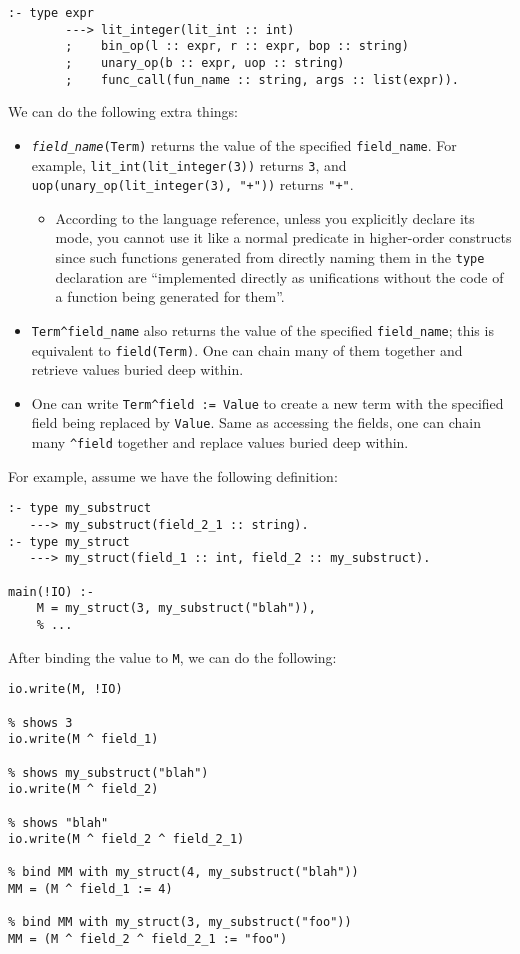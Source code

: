 \begin{lstlisting}[language=Mercury]
:- type expr
        ---> lit_integer(lit_int :: int)
        ;    bin_op(l :: expr, r :: expr, bop :: string)
        ;    unary_op(b :: expr, uop :: string)
        ;    func_call(fun_name :: string, args :: list(expr)).
\end{lstlisting}

  We can do the following extra things:

  \begin{itemize}
  \item \texttt{\textit{field_name}(Term)} returns the value of the specified \texttt{field_name}. For example, \texttt{lit_int(lit_integer(3))} returns \texttt{3}, and \texttt{uop(unary_op(lit_integer(3), "+"))} returns \texttt{"+"}.
    \begin{itemize}
    \item According to the language reference, unless you explicitly declare its mode, you cannot use it like a normal predicate in higher-order constructs since such functions generated from directly naming them in the \texttt{type} declaration are ``implemented directly as unifications without the code of a function being generated for them''.
    \end{itemize}
  \item \texttt{Term\;\textasciicircum\;field_name} also returns the value of the specified \texttt{field_name}; this is equivalent to \texttt{field(Term)}. One can chain many of them together and retrieve values buried deep within.
  \item One can write \texttt{Term\;\textasciicircum\;field := Value} to create a new term with the specified field being replaced by \texttt{Value}. Same as accessing the fields, one can chain many \texttt{\textasciicircum field} together and replace values buried deep within.
  \end{itemize}

  For example, assume we have the following definition:
\begin{lstlisting}[language=Mercury]
:- type my_substruct
   ---> my_substruct(field_2_1 :: string).
:- type my_struct
   ---> my_struct(field_1 :: int, field_2 :: my_substruct).

main(!IO) :-
	M = my_struct(3, my_substruct("blah")),
    % ...
\end{lstlisting}

  After binding the value to \texttt{M}, we can do the following:

\begin{lstlisting}[language=Mercury]
% shows my_struct(3, my_substruct("blah"))
io.write(M, !IO)

% shows 3
io.write(M ^ field_1)

% shows my_substruct("blah")
io.write(M ^ field_2)

% shows "blah"
io.write(M ^ field_2 ^ field_2_1)

% bind MM with my_struct(4, my_substruct("blah"))
MM = (M ^ field_1 := 4)

% bind MM with my_struct(3, my_substruct("foo"))
MM = (M ^ field_2 ^ field_2_1 := "foo")
\end{lstlisting}

